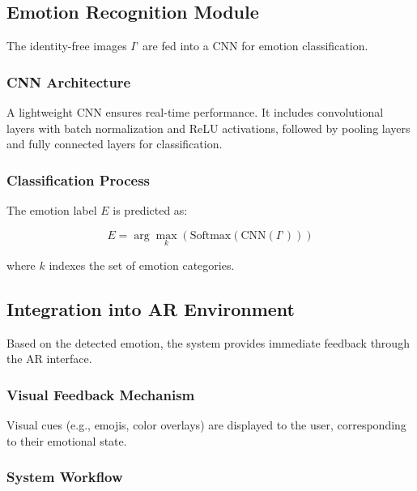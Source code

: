 \documentclass[lettersize,journal]{IEEEtran}
\begin{document}
\subsection{Emotion Recognition Module}

The identity-free images $I’$ are fed into a CNN for emotion classification.

\subsubsection{CNN Architecture}

A lightweight CNN ensures real-time performance. It includes convolutional layers with batch normalization and ReLU activations, followed by pooling layers and fully connected layers for classification.

\subsubsection{Classification Process}

The emotion label $E$ is predicted as:

\begin{equation}
E = \arg\max_{k} \left( \text{Softmax}(\text{CNN}(I’)) \right)
\end{equation}

where $k$ indexes the set of emotion categories.

\subsection{Integration into AR Environment}

Based on the detected emotion, the system provides immediate feedback through the AR interface.

\subsubsection{Visual Feedback Mechanism}

Visual cues (e.g., emojis, color overlays) are displayed to the user, corresponding to their emotional state.

\subsubsection{System Workflow}
\end{document}
